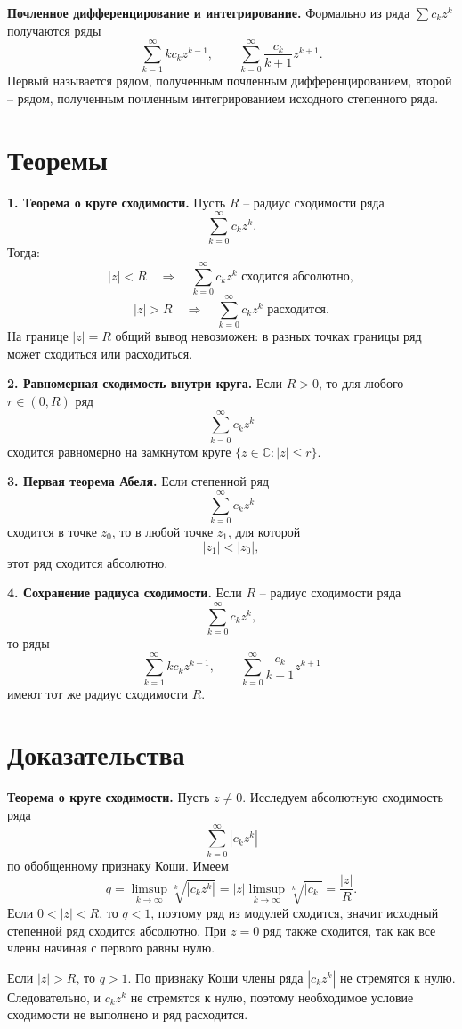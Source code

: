 \documentclass[12pt,a4paper]{article}
\newcommand{\CC}{\mathbb{C}}
\begin{document}
\textbf{Почленное дифференцирование и интегрирование.}
Формально из ряда \(\sum c_kz^k\) получаются ряды
\[
  \sum_{k=1}^{\infty}kc_kz^{k-1},
  \qquad
  \sum_{k=0}^{\infty}\frac{c_k}{k+1}z^{k+1}.
\]
Первый называется рядом, полученным почленным дифференцированием, второй --
рядом, полученным почленным интегрированием исходного степенного ряда.

\section*{Теоремы}

\textbf{1. Теорема о круге сходимости.}
Пусть \(R\) -- радиус сходимости ряда
\[
  \sum_{k=0}^{\infty}c_kz^k.
\]
Тогда:
\[
  |z|<R \quad\Longrightarrow\quad
  \sum_{k=0}^{\infty}c_kz^k \text{ сходится абсолютно},
\]
\[
  |z|>R \quad\Longrightarrow\quad
  \sum_{k=0}^{\infty}c_kz^k \text{ расходится}.
\]
На границе \(|z|=R\) общий вывод невозможен: в разных точках границы ряд может
сходиться или расходиться.

\textbf{2. Равномерная сходимость внутри круга.}
Если \(R>0\), то для любого \(r\in(0,R)\) ряд
\[
  \sum_{k=0}^{\infty}c_kz^k
\]
сходится равномерно на замкнутом круге \(\{z\in\CC: |z|\le r\}\).

\textbf{3. Первая теорема Абеля.}
Если степенной ряд
\[
  \sum_{k=0}^{\infty}c_kz^k
\]
сходится в точке \(z_0\), то в любой точке \(z_1\), для которой
\[
  |z_1|<|z_0|,
\]
этот ряд сходится абсолютно.

\textbf{4. Сохранение радиуса сходимости.}
Если \(R\) -- радиус сходимости ряда
\[
  \sum_{k=0}^{\infty}c_kz^k,
\]
то ряды
\[
  \sum_{k=1}^{\infty}kc_kz^{k-1},
  \qquad
  \sum_{k=0}^{\infty}\frac{c_k}{k+1}z^{k+1}
\]
имеют тот же радиус сходимости \(R\).

\section*{Доказательства}

\textbf{Теорема о круге сходимости.}
Пусть \(z\ne0\). Исследуем абсолютную сходимость ряда
\[
  \sum_{k=0}^{\infty}|c_kz^k|
\]
по обобщенному признаку Коши. Имеем
\[
  q=\limsup_{k\to\infty}\sqrt[k]{|c_kz^k|}
  =
  |z|\limsup_{k\to\infty}\sqrt[k]{|c_k|}
  =
  \frac{|z|}{R}.
\]
Если \(0<|z|<R\), то \(q<1\), поэтому ряд из модулей сходится, значит
исходный степенной ряд сходится абсолютно. При \(z=0\) ряд также сходится,
так как все члены начиная с первого равны нулю.

Если \(|z|>R\), то \(q>1\). По признаку Коши члены ряда
\(|c_kz^k|\) не стремятся к нулю. Следовательно, и \(c_kz^k\) не стремятся к
нулю, поэтому необходимое условие сходимости не выполнено и ряд расходится.
\end{document}
